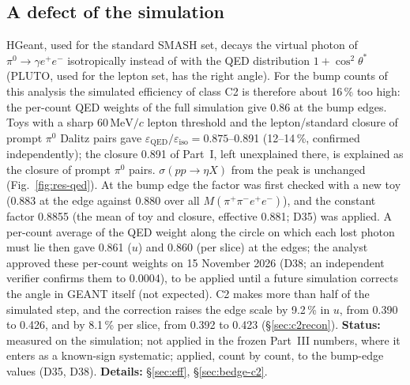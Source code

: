\documentclass[11pt,a4paper]{article}
\newcommand{\piz}{\ensuremath{\pi^{0}}\xspace}
\newcommand{\ee}{\ensuremath{e^{+}e^{-}}\xspace}
\newcommand{\Mfour}{\ensuremath{M(\pi^{+}\pi^{-}e^{+}e^{-})}\xspace}
\newcommand{\MeVc}{\ensuremath{\mathrm{MeV}/c}\xspace}
\newcommand{\sigeta}{\ensuremath{\sigma(pp\to\eta X)}\xspace}
\begin{document}
\subsection{A defect of the simulation}
\label{sec:res-qed}
HGeant, used for the standard SMASH set, decays the virtual photon of $\piz\to\gamma\ee$ isotropically instead of with the QED distribution
$1+\cos^2\theta^*$ (PLUTO, used for the lepton set, has the right angle). For the bump counts of this analysis the
simulated efficiency of class C2 is therefore about 16\,\% too high: the per-count QED weights of the full simulation give 0.86 at the bump
edges. Toys with a sharp 60\,\MeVc lepton threshold and the lepton/standard closure of prompt \piz Dalitz pairs gave
$\varepsilon_{\mathrm{QED}}/\varepsilon_{\mathrm{iso}}=0.875$--0.891 (12--14\,\%, confirmed independently); the closure 0.891 of Part~I, left
unexplained there, is explained as the closure of prompt \piz pairs. \sigeta from the peak is unchanged (Fig.~\ref{fig:res-qed}). At the bump edge
the factor was first checked with a new toy (0.883 at the edge against 0.880 over all \Mfour), and the constant factor 0.8855 (the mean of toy and
closure, effective 0.881; D35) was applied. A per-count average of the QED weight along the circle on which each lost photon must lie then gave
0.861 ($u$) and 0.860 (per slice) at the edges; the analyst approved these per-count weights on 15 November 2026 (D38; an independent verifier
confirms them to 0.0004), to be applied until a future simulation corrects the angle in GEANT itself (not expected). C2 makes more than half of
the simulated step, and the correction raises the edge scale by 9.2\,\% in $u$, from 0.390 to 0.426, and by 8.1\,\% per slice, from 0.392 to
0.423 (\S\ref{sec:c2recon}).
\textbf{Status:} measured on the simulation; not applied in the frozen Part~III numbers, where it enters as a known-sign systematic; applied,
count by count, to the bump-edge values (D35, D38). \textbf{Details:} \S\ref{sec:eff}, \S\ref{sec:bedge-c2}.
\end{document}
